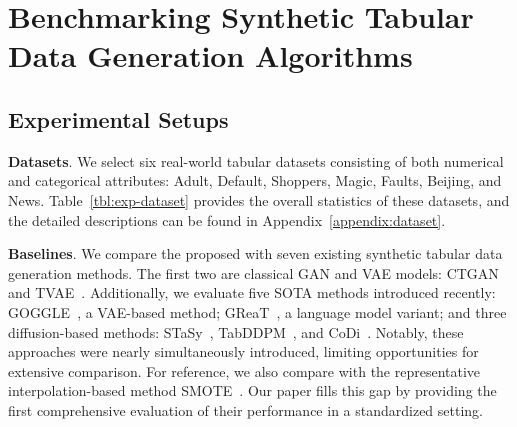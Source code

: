 \section{Benchmarking Synthetic Tabular Data Generation Algorithms}
\label{sec:exp}

\subsection{Experimental Setups}
\textbf{Datasets}. We select six real-world tabular datasets consisting of both numerical and categorical attributes: Adult, Default, Shoppers, Magic, Faults, Beijing, and News. Table~\ref{tbl:exp-dataset} provides the overall statistics of these datasets, and the detailed descriptions can be found in Appendix~\ref{appendix:dataset}.

\textbf{Baselines}.
We compare the proposed \modelname with seven existing synthetic tabular data generation methods. The first two are classical GAN and VAE models: CTGAN~\citep{ctgan} and TVAE~\citep{ctgan}. Additionally, we evaluate five SOTA methods introduced recently: GOGGLE~\citep{goggle}, a VAE-based method; GReaT~\citep{great}, a language model variant; and three diffusion-based methods: STaSy~\citep{stasy}, TabDDPM~\citep{tabddpm}, and CoDi~\citep{codi}. Notably, these approaches were nearly simultaneously introduced, limiting opportunities for extensive comparison. For reference, we also compare with the representative interpolation-based method SMOTE~\citep{smote}. Our paper fills this gap by providing the first comprehensive evaluation of their performance in a standardized setting. 

